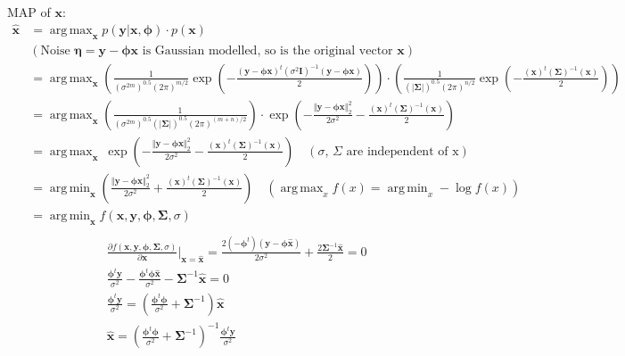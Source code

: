 \documentclass[fleqn, 11pt]{article}
\DeclareMathOperator*{\argmin}{arg\,min}
\DeclareMathOperator*{\argmax}{arg\,max}
\newcommand{\bs}[1]{\boldsymbol{#1}}
\begin{document}
MAP of $\bs{x}$:
\begin{equation*}
    \begin{aligned}
        \bs{\hat{x}}
            &= \argmax_{\bs{x}} p(\bs{y} \vert \bs{x}, \bs{\phi}) \cdot p(\bs{x}) \\
            & (\text{Noise $\bs{\eta} = \bs{y} - \bs{\phi} \bs{x}$ is Gaussian modelled, so is the original vector $\bs{x}$}) \\
            &= \argmax_{\bs{x}} \left( \frac{1}{(\sigma^{2m})^{0.5} (2\pi)^{m/2}} \exp \left(-\frac{(\bs{y} - \bs{\phi} \bs{x})^t (\sigma^2 \bs{I})^{-1} (\bs{y} - \bs{\phi} \bs{x})}{2} \right) \right) \cdot \left( \frac{1}{(\vert\bs{\Sigma}\vert)^{0.5} (2\pi)^{n/2}} \exp \left(-\frac{(\bs{x})^t (\bs{\Sigma})^{-1} (\bs{x})}{2} \right) \right) \\
            &= \argmax_{\bs{x}} \left( \frac{1}{(\sigma^{2m})^{0.5} (\vert\bs{\Sigma}\vert)^{0.5} (2\pi)^{(m+n)/2}} \right) \cdot \exp \left(-\frac{ \Vert \bs{y} - \bs{\phi} \bs{x} \Vert_2^2}{2 \sigma^2} -\frac{(\bs{x})^t (\bs{\Sigma})^{-1} (\bs{x})}{2} \right) \\
            &= \argmax_{\bs{x}} \ \exp \left(-\frac{ \Vert \bs{y} - \bs{\phi} \bs{x} \Vert_2^2}{2 \sigma^2} -\frac{(\bs{x})^t (\bs{\Sigma})^{-1} (\bs{x})}{2} \right) \quad (\text{$\sigma$, $\Sigma$ are independent of x}) \\
            &= \argmin_{\bs{x}} \left( \frac{ \Vert \bs{y} - \bs{\phi} \bs{x} \Vert_2^2}{2 \sigma^2}  +\frac{(\bs{x})^t (\bs{\Sigma})^{-1} (\bs{x})}{2} \right) \quad (\argmax_x f(x) = \argmin_x -\log f(x)) \\
            &= \argmin_{\bs{x}} f(\bs{x}, \bs{y}, \bs{\phi}, \bs{\Sigma}, \sigma) \\
    \end{aligned}
\end{equation*}
\begin{equation*}
    \begin{aligned}
        & \frac{\partial f(\bs{x}, \bs{y}, \bs{\phi}, \bs{\Sigma}, \sigma)}{\partial \bs{x}} \bigg\vert_{\bs{x} = \bs{\hat{x}}} = \frac{2 (-\bs{\phi}^t) (\bs{y} - \bs{\phi} \bs{\hat{x}})}{2 \sigma^2} + \frac{2 \bs{\Sigma}^{-1} \bs{\hat{x}}}{2} = 0 \\
        & \frac{\bs{\phi}^t \bs{y}}{\sigma^2} - \frac{\bs{\phi}^t \bs{\phi} \bs{\hat{x}}}{\sigma^2} - \bs{\Sigma}^{-1} \bs{\hat{x}} = 0 \\
        & \frac{\bs{\phi}^t \bs{y}}{\sigma^2} = \left( \frac{\bs{\phi}^t \bs{\phi}}{\sigma^2} + \bs{\Sigma}^{-1} \right) \bs{\hat{x}} \\
        & \bs{\hat{x}} = \left( \frac{\bs{\phi}^t \bs{\phi}}{\sigma^2} + \bs{\Sigma}^{-1} \right)^{-1} \frac{\bs{\phi}^t \bs{y}}{\sigma^2} \\
    \end{aligned}
\end{equation*}
\end{document}
